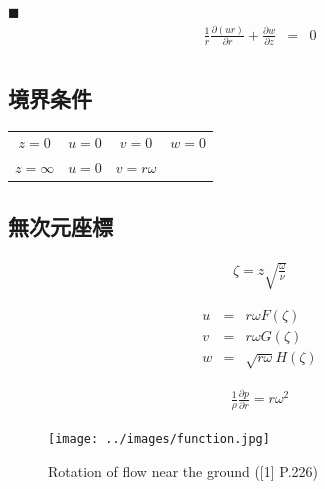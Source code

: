 \documentclass[twocolumn,a4j]{jsarticle}
\begin{document}
$\blacksquare$ 
\begin{eqnarray*}
  \frac{1}{r} \frac{\partial \left(ur\right)}{\partial r} + \frac{\partial w}{\partial z} &=& 0\\
\end{eqnarray*}

\subsection*{境界条件}
\begin{table}[hbtp]
  \centering
  \begin{tabular}{ c c c c }
    $z=0$      & $u=0$ & $v=0$        & $w=0$ \\
    $z=\infty$ & $u=0$ & $v=r \omega$ &       \\
  \end{tabular}
\end{table}

\subsection*{無次元座標}
\begin{eqnarray*}
  \zeta = z \sqrt{\frac{\omega}{\nu}}
\end{eqnarray*}

\begin{eqnarray*}
  u &=& r \omega F \left(\zeta\right)\\
  v &=& r \omega G \left(\zeta\right)\\
  w &=& \sqrt{r \omega} H \left(\zeta\right)
\end{eqnarray*}

\begin{eqnarray*}
  \frac{1}{\rho} \frac{\partial p}{\partial r} = r \omega ^2
\end{eqnarray*}

\begin{figure}[htbp]
  \footnotesize
  \begin{center}
    \texttt{[image: ../images/function.jpg]}
    \caption{Rotation of flow near the ground ([1] P.226)}
  \end{center}
\end{figure}
\end{document}
